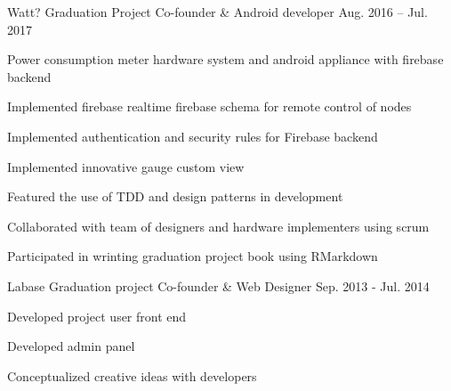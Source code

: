 \begin{cvprojects}
\cvproject
    {Watt? Graduation Project} %
    {Co-founder \& Android developer} %
    {Aug. 2016 – Jul. 2017} %
    {
      \begin{cvitems} %
        \item {Power consumption meter hardware system and android appliance with firebase backend}
        \item {Implemented firebase realtime firebase schema for remote control of nodes}
        \item {Implemented authentication and security rules for Firebase backend}
        \item {Implemented innovative gauge custom view}
        \item {Featured the use of TDD and design patterns in development}
        \item {Collaborated with team of designers and hardware implementers using scrum}
        \item {Participated in wrinting graduation project book using RMarkdown}        
      \end{cvitems}
    }

\cvproject
{Labase Graduation project} %
{Co-founder \& Web Designer} %
{Sep. 2013 - Jul. 2014} %
{
  \begin{cvitems} %
    \item {Developed project user front end}
    \item {Developed admin panel}
    \item {Conceptualized creative ideas with developers}
  \end{cvitems}
}

\end{cvprojects}
